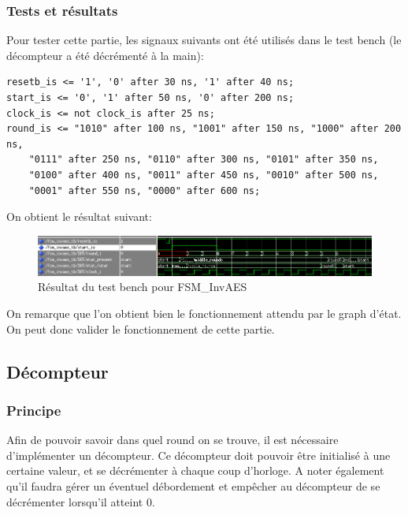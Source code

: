 \documentclass[a4paper, 12pt]{article}
\begin{document}
		\subsubsection{Tests et résultats}
	Pour tester cette partie, les signaux suivants ont été utilisés dans le test bench (le décompteur a été décrémenté à la main):
		\begin{lstlisting}
resetb_is <= '1', '0' after 30 ns, '1' after 40 ns;
start_is <= '0', '1' after 50 ns, '0' after 200 ns;
clock_is <= not clock_is after 25 ns;
round_is <= "1010" after 100 ns, "1001" after 150 ns, "1000" after 200 ns, 
	"0111" after 250 ns, "0110" after 300 ns, "0101" after 350 ns, 
	"0100" after 400 ns, "0011" after 450 ns, "0010" after 500 ns, 
	"0001" after 550 ns, "0000" after 600 ns;
		\end{lstlisting}

On obtient le résultat suivant:
			\begin{figure}[H]
				\begin{center}
				\includegraphics[scale=0.64]{Images/FSMInvAESTb.png}
				\end{center}
				\caption{Résultat du test bench pour FSM\_InvAES}
				\label{FSMInvAESTb}
			\end{figure}
On remarque que l'on obtient bien le fonctionnement attendu par le graph d'état. On peut donc valider le fonctionnement de cette partie. 
	\subsection{Décompteur}
		\subsubsection{Principe}
	Afin de pouvoir savoir dans quel round on se trouve, il est nécessaire d'implémenter un décompteur. Ce décompteur doit pouvoir être initialisé à une certaine valeur, et se décrémenter à chaque coup d'horloge. A noter également qu'il faudra gérer un éventuel débordement et empêcher au décompteur de se décrémenter lorsqu'il atteint 0.
\end{document}
